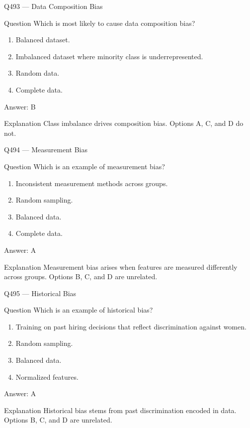 \documentclass[aspectratio=169,8pt]{beamer}
\begin{document}
	\begin{frame}{Q493 --- Data Composition Bias}
		\begin{block}{Question}
			Which is most likely to cause data composition bias?
			\begin{enumerate}
				\item Balanced dataset.
				\item Imbalanced dataset where minority class is underrepresented.
				\item Random data.
				\item Complete data.
			\end{enumerate}
		\end{block}
		\begin{exampleblock}{Answer: B}\end{exampleblock}
		\begin{block}{Explanation}
			Class imbalance drives composition bias. Options A, C, and D do not.
		\end{block}
	\end{frame}
	
	\begin{frame}{Q494 --- Measurement Bias}
		\begin{block}{Question}
			Which is an example of measurement bias?
			\begin{enumerate}
				\item Inconsistent measurement methods across groups.
				\item Random sampling.
				\item Balanced data.
				\item Complete data.
			\end{enumerate}
		\end{block}
		\begin{exampleblock}{Answer: A}\end{exampleblock}
		\begin{block}{Explanation}
			Measurement bias arises when features are measured differently across groups. Options B, C, and D are unrelated.
		\end{block}
	\end{frame}
	
	\begin{frame}{Q495 --- Historical Bias}
		\begin{block}{Question}
			Which is an example of historical bias?
			\begin{enumerate}
				\item Training on past hiring decisions that reflect discrimination against women.
				\item Random sampling.
				\item Balanced data.
				\item Normalized features.
			\end{enumerate}
		\end{block}
		\begin{exampleblock}{Answer: A}\end{exampleblock}
		\begin{block}{Explanation}
			Historical bias stems from past discrimination encoded in data. Options B, C, and D are unrelated.
		\end{block}
	\end{frame}
	
\end{document}
